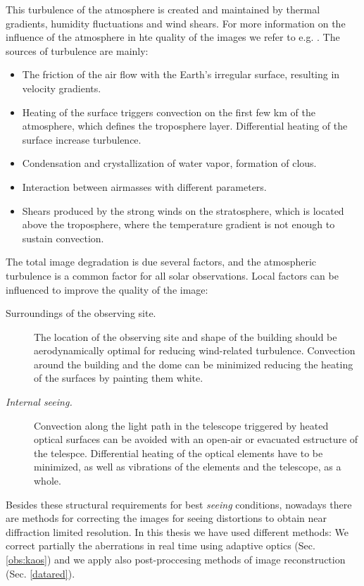 This turbulence of the atmosphere is created and maintained by thermal gradients, humidity fluctuations  and wind shears. For more information on the influence of the atmosphere in hte quality of the images we refer to e.g.  \citealt{2002RvMP...74..551S}. The sources of turbulence are mainly:
\begin{itemize}
\item The friction of the air flow with the Earth's irregular surface, resulting in velocity gradients.
\item Heating of the surface triggers convection on the first few km of the atmosphere, which defines the troposphere layer. Differential heating of the surface increase turbulence.
\item Condensation and crystallization of water vapor, formation of clous.
\item Interaction between airmasses with different parameters.
\item Shears produced by the strong winds on the stratosphere, which is located above the troposphere, where the temperature gradient is not enough to sustain convection.
\end{itemize}

The total image degradation is due several factors, and the atmospheric turbulence is a common factor for all solar observations. Local factors can be influenced to improve the quality of the image:
\begin{description}
\item[Surroundings of the observing site.] The location of the observing site and shape of the building should be aerodynamically optimal for reducing wind-related turbulence. Convection around the building and the dome can be minimized reducing the heating of the surfaces by painting them white.
\item[\emph{Internal seeing.}] Convection along the light path in the telescope triggered by heated optical surfaces can be avoided with an open-air or evacuated estructure of the telespce. Differential heating of the optical elements have to be minimized, as well as vibrations of the elements and the telescope, as a whole.
\end{description}


Besides these structural requirements for best \emph{seeing} conditions, nowadays there are methods for correcting the images for seeing distortions to obtain near diffraction limited resolution. In this thesis we have used different methods: We correct partially the aberrations in real time using adaptive optics (Sec. \ref{obs:kaos}) and we apply also post-proccesing methods of image reconstruction (Sec. \ref{datared}).